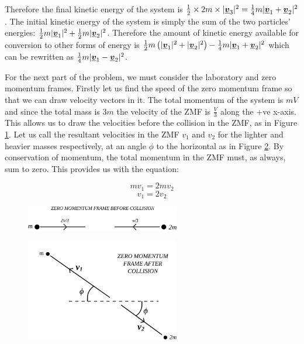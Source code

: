 \begin{problem}
{Therefore the final kinetic energy of the system is $\frac{1}{2}\times 2m \times |\mathit{\underline{\boldsymbol{v}}}_{3}|^2=\frac{1}{4}m|\mathit{\underline{\boldsymbol{v}}}_{1}+\mathit{\underline{\boldsymbol{v}}}_{2}|^2$. The initial kinetic energy of the system is simply the sum of the two particles' energies: $\frac{1}{2}m|\mathit{\underline{\boldsymbol{v}}}_{1}|^2+\frac{1}{2}m|\mathit{\underline{\boldsymbol{v}}}_{2}|^2$. Therefore the amount of kinetic energy available for conversion to other forms of energy is $\frac{1}{2}m\left(|\mathit{\underline{\boldsymbol{v}}}_{1}|^2+|\mathit{\underline{\boldsymbol{v}}}_{2}|^2\right)-\frac{1}{4}m|\mathit{\underline{\boldsymbol{v}}}_{1}+\mathit{\underline{\boldsymbol{v}}}_{2}|^2$ which can be rewritten as $\frac{1}{4}m|\mathit{\underline{\boldsymbol{v}}}_{1}-\mathit{\underline{\boldsymbol{v}}}_{2}|^2$.

For the next part of the problem, we must consider the laboratory and zero momentum frames. Firstly let us find the speed of the zero momentum frame so that we can draw velocity vectors in it. The total momentum of the system is $mV$ and since the total mass is $3m$ the velocity of the ZMF is $\frac{V}{3}$ along the +ve x-axis. This allows us to draw the velocities before the collision in the ZMF, as in Figure \ref{fig:Tripos_Inelastic_ZMF_1}. Let us call the resultant velocities in the ZMF $v_1$ and $v_2$ for the lighter and heavier masses respectively, at an angle $\phi$ to the horizontal as in Figure \ref{fig:Tripos_Inelastic_ZMF_2}. By conservation of momentum, the total momentum in the ZMF must, as always, sum to zero. This provides us with the equation:

\begin{equation*}mv_1=2mv_2\end{equation*}
\begin{equation}v_1=2v_2\end{equation}


\begin{figure}[h]
	\centering
	\includegraphics[width=0.6\textwidth]{../../../figures/Tripos_Inelastic_ZMF_1.svg}
	\caption{}
	\label{fig:Tripos_Inelastic_ZMF_1}
\end{figure}

\begin{figure}[h]
	\centering
	\includegraphics[width=0.6\textwidth]{../../../figures/Tripos_Inelastic_ZMF_2.svg}
	\caption{}
	\label{fig:Tripos_Inelastic_ZMF_2}
\end{figure}


}
\end{problem}
